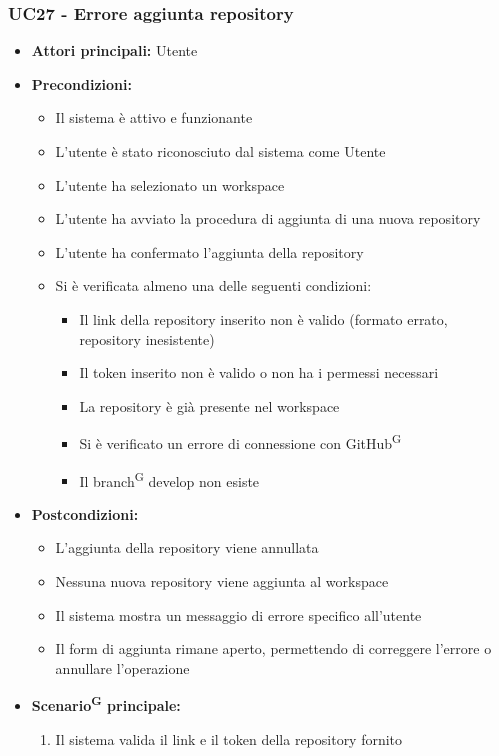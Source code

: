 \documentclass[a4paper, 11pt]{article}
\begin{document}
\subsubsection{UC27 - Errore aggiunta repository}\label{UC27}
\begin{itemize}
	\item \textbf{Attori principali:} Utente
	\item \textbf{Precondizioni:}
	\begin{itemize}
		\item Il sistema è attivo e funzionante
		\item L'utente è stato riconosciuto dal sistema come Utente
		\item L'utente ha selezionato un workspace
		\item L'utente ha avviato la procedura di aggiunta di una nuova repository
		\item L'utente ha confermato l'aggiunta della repository
		\item Si è verificata almeno una delle seguenti condizioni:
		\begin{itemize}
			\item Il link della repository inserito non è valido (formato errato, repository inesistente)
			\item Il token inserito non è valido o non ha i permessi necessari
			\item La repository è già presente nel workspace
			\item Si è verificato un errore di connessione con GitHub\textsuperscript{G}
			\item Il branch\textsuperscript{G} develop non esiste
		\end{itemize}
	\end{itemize}
	\item \textbf{Postcondizioni:}
	\begin{itemize}
		\item L'aggiunta della repository viene annullata
		\item Nessuna nuova repository viene aggiunta al workspace
		\item Il sistema mostra un messaggio di errore specifico all'utente
		\item Il form di aggiunta rimane aperto, permettendo di correggere l'errore o annullare l'operazione
	\end{itemize}
	\item \textbf{Scenario\textsuperscript{G} principale:}
	\begin{enumerate}
		\item Il sistema valida il link e il token della repository fornito

\end{enumerate}
\end{itemize}
\end{document}
